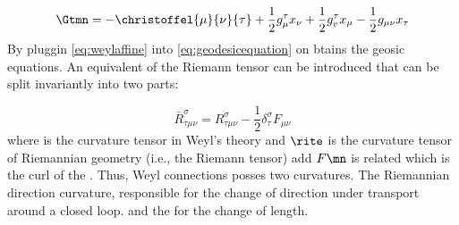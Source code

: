 {\begin{equation*}\label{eq:weylaffine}
\Gtmn = - \christoffel{\mu}{\nu}{\tau} +\frac{1}{2} g_{\mu}^{\tau} x_{\nu}+\frac{1}{2} g_{v}^{\tau} x_{\mu}-\frac{1}{2} g_{\mu \nu} x_\tau
\end{equation*}
%
By pluggin \cref{eq:weylaffine} into \cref{eq:geodesicequation} on btains the geosic equations.  An equivalent of the Riemann tensor \riteg can be introduced that can be split invariantly into two parts:

$$\bar{R}_{\tau \mu \nu}^{\sigma}=R_{\tau \mu \nu}^{\sigma}-\frac{1}{2} \delta_{\tau}^{\sigma} F_{\mu \nu}$$
%
where \rite is the curvature tensor in Weyl's theory and $\rite$ is the curvature tensor of Riemannian geometry (i.e., the Riemann tensor) add $F\mn$ is related which is the curl of the \phin. Thus, Weyl connections posses two curvatures. The Riemannian direction curvature, responsible for the change of direction under transport around a closed loop. and the  for the change of length. 







}
